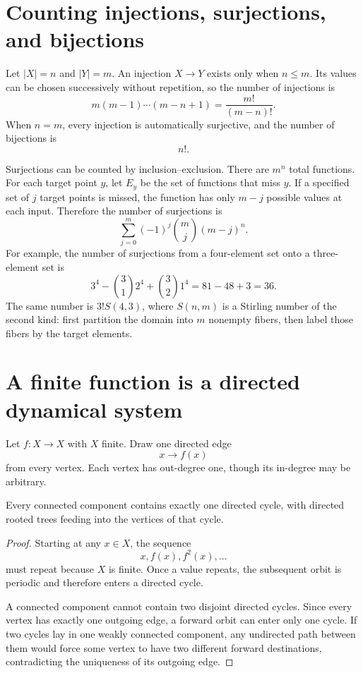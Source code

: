 \section{Counting injections, surjections, and bijections}

Let \(|X|=n\) and \(|Y|=m\).  An injection \(X\to Y\) exists only when \(n\leq m\).  Its values can be chosen successively without repetition, so the number of injections is
\[
  m(m-1)\cdots(m-n+1)
  =\frac{m!}{(m-n)!}.
\]
When \(n=m\), every injection is automatically surjective, and the number of bijections is
\[
  n!.
\]

Surjections can be counted by inclusion--exclusion.  There are \(m^n\) total functions.  For each target point \(y\), let \(E_y\) be the set of functions that miss \(y\).  If a specified set of \(j\) target points is missed, the function has only \(m-j\) possible values at each input.  Therefore the number of surjections is
\[
  \boxed{
  \sum_{j=0}^{m}(-1)^j\binom{m}{j}(m-j)^n.}
\]
For example, the number of surjections from a four-element set onto a three-element set is
\[
  3^4-\binom31 2^4+\binom32 1^4
  =81-48+3=36.
\]
The same number is \(3!S(4,3)\), where \(S(n,m)\) is a Stirling number of the second kind: first partition the domain into \(m\) nonempty fibers, then label those fibers by the target elements.

\section{A finite function is a directed dynamical system}

Let \(f:X\to X\) with \(X\) finite.  Draw one directed edge
\[
  x\longrightarrow f(x)
\]
from every vertex.  Each vertex has out-degree one, though its in-degree may be arbitrary.

\begin{theorem}
Every connected component contains exactly one directed cycle, with directed rooted trees feeding into the vertices of that cycle.
\end{theorem}

\begin{proof}
Starting at any \(x\in X\), the sequence
\[
  x,f(x),f^2(x),\ldots
\]
must repeat because \(X\) is finite.  Once a value repeats, the subsequent orbit is periodic and therefore enters a directed cycle.

A connected component cannot contain two disjoint directed cycles.  Since every vertex has exactly one outgoing edge, a forward orbit can enter only one cycle.  If two cycles lay in one weakly connected component, any undirected path between them would force some vertex to have two different forward destinations, contradicting the uniqueness of its outgoing edge.
\end{proof}

